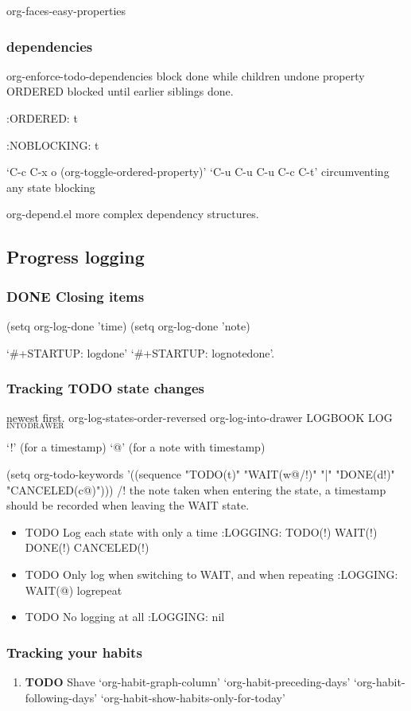\documentclass[11pt]{article}
\begin{document}
org-faces-easy-properties
\subsubsection{dependencies}
\label{sec:org477efcc}
org-enforce-todo-dependencies  block done while children undone
property ORDERED blocked until earlier siblings done.

:ORDERED: t

:NOBLOCKING: t

‘C-c C-x o     (org-toggle-ordered-property)’
‘C-u C-u C-u C-c C-t’ circumventing any state blocking

org-depend.el  more complex dependency structures.
\subsection{Progress logging}
\label{sec:org94a6ea5}
\subsubsection{{\bfseries\sffamily DONE} Closing items}
\label{sec:org706325a}
(setq org-log-done 'time)
(setq org-log-done 'note)

‘\#+STARTUP: logdone’
‘\#+STARTUP: lognotedone’.
\subsubsection{Tracking TODO state changes}
\label{sec:org30de272}
newest first.  org-log-states-order-reversed
org-log-into-drawer
LOGBOOK
LOG\(_{\text{INTO}}\)\(_{\text{DRAWER}}\)

‘!’ (for a timestamp) 
‘@’ (for a note with timestamp)

(setq org-todo-keywords
    '((sequence "TODO(t)" "WAIT(w@/!)" "|" "DONE(d!)" "CANCELED(c@)")))
/!
the note taken when entering the state, 
a timestamp should be recorded when leaving the WAIT state.

\begin{itemize}
\item TODO Log each state with only a time
:LOGGING: TODO(!) WAIT(!) DONE(!) CANCELED(!)
\item TODO Only log when switching to WAIT, and when repeating
:LOGGING: WAIT(@) logrepeat
\item TODO No logging at all
:LOGGING: nil
\end{itemize}
\subsubsection{Tracking your habits}
\label{sec:org582f068}
\begin{enumerate}
\item {\bfseries\sffamily TODO} Shave
\label{sec:org0d66577}
‘org-habit-graph-column’
‘org-habit-preceding-days’
‘org-habit-following-days’
‘org-habit-show-habits-only-for-today’
\end{enumerate}
\end{document}

